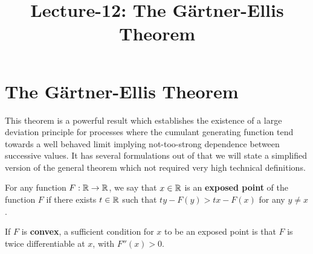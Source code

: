 \documentclass[letterpaper,english,10pt]{article}
\title{Lecture-12: The G\"{a}rtner-Ellis Theorem}
\begin{document}
\maketitle
\section{The G\"{a}rtner-Ellis Theorem}
This theorem is a powerful result which establishes the existence of a large deviation principle for processes where the cumulant generating function tend towards a well behaved limit implying not-too-strong dependence between successive values.  
It has several formulations out of that we will state a simplified version of the general theorem which not required very high technical definitions. 
\begin{defn} 
For any function $F: \mathbb{R} \to \mathbb{R}$, we say that $x \in \mathbb{R}$ is an \textbf{exposed point} of the function $F$ if there exists $t \in \mathbb{R}$ such that $ty- F(y)> tx -F(x)$ for any $y \neq x$. 
\end{defn}
If $F$ is \textbf{convex}, a sufficient condition for $x$ to be an exposed point is that $F$ is twice differentiable at $x$, with $F''(x) > 0$.
\end{document}
